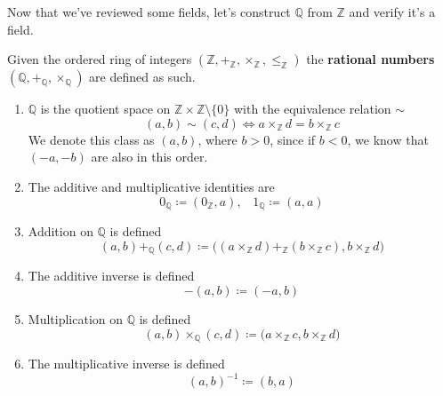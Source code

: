 \documentclass{article}
\begin{document}
      Now that we've reviewed some fields, let's construct $\mathbb{Q}$ from $\mathbb{Z}$ and verify it's a field. 

      \begin{definition}[Rationals]
        Given the ordered ring of integers $(\mathbb{Z}, +_{\mathbb{Z}}, \times_{\mathbb{Z}}, \leq_{\mathbb{Z}})$ the \textbf{rational numbers} $(\mathbb{Q}, +_{\mathbb{Q}}, \times_{\mathbb{Q}})$ are defined as such. 
        \begin{enumerate}
          \item $\mathbb{Q}$ is the quotient space on $\mathbb{Z} \times \mathbb{Z} \setminus \{0\}$ with the equivalence relation $\sim$ 
          \begin{equation}
            (a, b) \sim (c, d) \iff a \times_{\mathbb{Z}} d = b \times_{\mathbb{Z}} c
          \end{equation} 
          We denote this class as $(a, b)$, where $b > 0$, since if $b < 0$, we know that $(-a, -b)$ are also in this order. 

          \item The additive and multiplicative identities are 
          \begin{equation}
            0_{\mathbb{Q}} \coloneqq (0_{\mathbb{Z}}, a), \;\;\; 1_{\mathbb{Q}} \coloneqq (a, a)
          \end{equation}

          \item Addition on $\mathbb{Q}$ is defined 
          \begin{equation}
            (a, b) +_{\mathbb{Q}} (c, d) \coloneqq \big( (a \times_{\mathbb{Z}} d) +_{\mathbb{Z}} (b \times_{\mathbb{Z}} c), b \times_{\mathbb{Z}} d \big) 
          \end{equation}

          \item The additive inverse is defined 
          \begin{equation}
            -(a, b) \coloneqq (-a, b)
          \end{equation}

          \item Multiplication on $\mathbb{Q}$ is defined 
          \begin{equation}
            (a, b) \times_{\mathbb{Q}} (c, d) \coloneqq \big( a \times_{\mathbb{Z}} c, b \times_{\mathbb{Z}} d \big)
          \end{equation} 

          \item The multiplicative inverse is defined 
          \begin{equation}
            (a, b)^{-1} \coloneqq (b, a)
          \end{equation}
        \end{enumerate}
      \end{definition}
\end{document}
